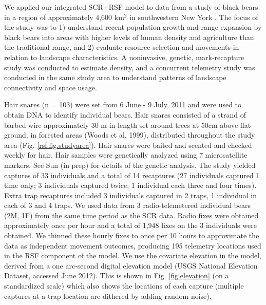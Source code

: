 \documentclass[12pt]{article}
\begin{document}
We applied our integrated SCR+RSF model to data from a study of black bears in a
region of approximately 4,600 km$^2$ in southwestern New York \citep{sun:2012}.
 The focus of the study was to 1) understand recent
population growth and range expansion by black bears into areas with
higher levels of human density and agriculture than the traditional
range, and 2) evaluate resource selection and movements in relation to
landscape characteristics.  A noninvasive, genetic, mark-recapture
study was conducted to estimate density, and a concurrent telemetry
study was conducted in the same study area to understand patterns of
landscape connectivity and space usage.

Hair snares (n = 103) were set from 6 June - 9 July, 2011 and were
used to obtain DNA to identify individual bears.  Hair snares
consisted of a strand of barbed wire approximately 30 m in length set
around trees at 50cm above flat ground, in forested areas (Woods et
al. 1999), distributed throughout the study area (Fig. \ref{rsf.fig.studyarea}). Hair snares
were baited and scented and checked weekly for hair. Hair samples were
genetically analyzed using 7 microsatellite markers. See Sun (in prep)
for details of the genetic analysis.
 The study yielded
captures of 33 individuals and a total of 14 recaptures (27
individuals captured 1 time only; 3 individuals captured twice; 1
individual each three and four times). Extra trap recaptures included
3 individuals captured in 2 traps, 1 individual in each of 3 and 4
traps.  We used data from 3 radio-telemetered individual bears (2M,
1F) from the same time period as the SCR data. Radio fixes were
obtained approximately once per hour and a total of 1,948 fixes on the
3 individuals were obtained. We thinned these hourly fixes to once per
10 hours to approximate the data as independent movement outcomes,
producing 195 telemetry locations used in the RSF component of the
model.  We use the covariate elevation in the model, derived from a
one arc-second digital elevation model (USGS National Elevation
Dataset, accessed June 2012).  This is shown in
Fig. \ref{fig.elevation} (on a
standardized scale) which also shows the locations of each capture
(multiple captures at a trap location are dithered by adding random
noise).
\end{document}
